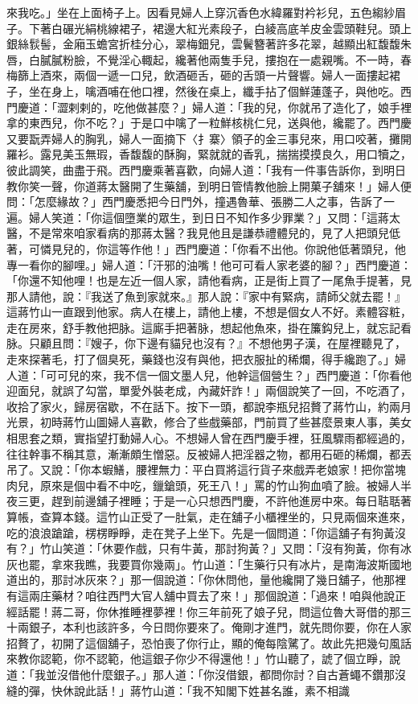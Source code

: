 \begin{showcontents}{}
來我吃。」坐在上面椅子上。因看見婦人上穿沉香色水緯羅對衿衫兒，五色縐紗眉子。下著白碾光絹桃線裙子，裙邊大紅光素段子，白綾高底羊皮金雲頭鞋兒。頭上銀絲䯼髻，金廂玉蟾宮折桂分心，翠梅鈿兒，雲鬢簪著許多花翠，越顯出紅馥馥朱唇，白膩膩粉臉，不覺淫心輙起，纔著他兩隻手兒，摟抱在一處親嘴。不一時，春梅篩上酒來，兩個一遞一口兒，飲酒砸舌，砸的舌頭一片聲響。婦人一面摟起裙子，坐在身上，噙酒哺在他口裡，然後在桌上，纖手拈了個鮮蓮蓬子，與他吃。西門慶道：「澀剌剌的，吃他做甚麼？」婦人道：「我的兒，你就吊了造化了，娘手裡拿的東西兒，你不吃？」于是口中噙了一粒鮮核桃仁兒，送與他，纔罷了。西門慶又要翫弄婦人的胸乳，婦人一面摘下〈扌寨〉領子的金三事兒來，用口咬著，攤開羅衫。露見美玉無瑕，香馥馥的酥胸，緊就就的香乳，揣揣摸摸良久，用口犢之，彼此調笑，曲盡于飛。西門慶乘著喜歡，向婦人道：「我有一件事告訴你，到明日教你笑一聲，你道蔣太醫開了生藥舖，到明日管情教他臉上開菓子舖來！」婦人便問：「怎麼緣故？」西門慶悉把今日門外，撞遇魯華、張勝二人之事，告訴了一遍。婦人笑道：「你這個墮業的眾生，到日日不知作多少罪業？」又問：「這蔣太醫，不是常來咱家看病的那蔣太醫？我見他且是謙恭禮體兒的，見了人把頭兒低著，可憐見兒的，你這等作他！」西門慶道：「你看不出他。你說他低著頭兒，他專一看你的腳哩。」婦人道：「汗邪的油嘴！他可可看人家老婆的腳？」西門慶道：「你還不知他哩！也是左近一個人家，請他看病，正是街上買了一尾魚手提著，見那人請他，說：『我送了魚到家就來。』那人說：『家中有緊病，請師父就去罷！』這蔣竹山一直跟到他家。病人在樓上，請他上樓，不想是個女人不好。素體容粧，走在房來，舒手教他把脉。這廝手把著脉，想起他魚來，掛在簾鈎兒上，就忘記看脉。只顧且問：『嫂子，你下邊有貓兒也沒有？』不想他男子漢，在屋裡聽見了，走來探著毛，打了個臭死，藥錢也沒有與他，把衣服扯的稀爛，得手纔跑了。」婦人道：「可可兒的來，我不信一個文墨人兒，他幹這個營生？」西門慶道：「你看他迎面兒，就誤了勾當，單愛外裝老成，內藏奸詐！」兩個說笑了一回，不吃酒了，收拾了家火，歸房宿歇，不在話下。按下一頭，都說李瓶兒招贅了蔣竹山，約兩月光景，初時蔣竹山圖婦人喜歡，修合了些戲藥部，門前買了些甚麼景東人事，美女相思套之類，實指望打動婦人心。不想婦人曾在西門慶手裡，狂風驟雨都經過的，往往幹事不稱其意，漸漸頗生憎惡。反被婦人把淫器之物，都用石砸的稀爛，都丟吊了。又說：「你本蝦鱔，腰裡無力：平白買將這行貨子來戲弄老娘家！把你當塊肉兒，原來是個中看不中吃，鑞鎗頭，死王八！」罵的竹山狗血噴了臉。被婦人半夜三更，趕到前邊舖子裡睡；于是一心只想西門慶，不許他進房中來。每日聐聒著算帳，查算本錢。這竹山正受了一肚氣，走在舖子小櫃裡坐的，只見兩個來進來，吃的浪浪蹌蹌，楞楞睜睜，走在凳子上坐下。先是一個問道：「你這舖子有狗黃沒有？」竹山笑道：「休要作戲，只有牛黃，那討狗黃？」又問：「沒有狗黃，你有冰灰也罷，拿來我瞧，我要買你幾兩」。竹山道：「生藥行只有冰片，是南海波斯國地道出的，那討冰灰來？」那一個說道：「你休問他，量他纔開了幾日舖子，他那裡有這兩庄藥材？咱往西門大官人舖中買去了來！」那個說道：「過來！咱與他說正經話罷！蔣二哥，你休推睡裡夢裡！你三年前死了娘子兒，問這位魯大哥借的那三十兩銀子，本利也該許多，今日問你要來了。俺剛才進門，就先問你要，你在人家招贅了，初開了這個舖子，恐怕喪了你行止，顯的俺每陰騭了。故此先把幾句風話來教你認範，你不認範，他這銀子你少不得還他！」竹山聽了，諕了個立睜，說道：「我並沒借他什麼銀子。」那人道：「你沒借銀，都問你討？自古蒼蠅不鑽那沒縫的彈，快休說此話！」蔣竹山道：「我不知閣下姓甚名誰，素不相識
\end{showcontents}
